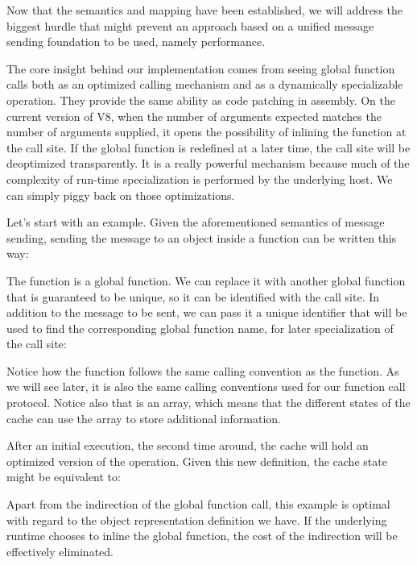 Now that the semantics and mapping have been established, we will address the
biggest hurdle that might prevent an approach based on a unified message
sending foundation to be used, namely performance.

The core insight behind our implementation comes from seeing global function
calls both as an optimized calling mechanism and as a dynamically specializable
operation. They provide the same ability as code patching in assembly. On
the current version of V8, when the number of arguments expected matches the
number of arguments supplied, it opens the possibility of inlining the function
at the call site. If the global function is redefined at a later time, the call
site will be deoptimized transparently. It is a really powerful mechanism
because much of the complexity of run-time specialization is performed by the
underlying host.  We can simply piggy back on those optimizations.

Let's start with an example. Given the aforementioned semantics of message
sending, sending the message  to an object  inside a 
function can be written this way:


The  function is a global function. We can replace it with another
global function that is guaranteed to be unique, so it can be identified with
the call site. In addition to the message to be sent, we can pass it a unique
identifier that will be used to find the corresponding global function name,
for later specialization of the call site:


Notice how the  function follows the same calling convention as
the  function. As we will see later, it is also the same calling
conventions used for our function call protocol. Notice also that
 is an array, which means that the different states of the cache
can use the array to store additional information.

After an initial execution, the second time around, the cache will hold an
optimized version of the operation. Given this new definition, the cache state
might be equivalent to:


Apart from the indirection of the global function call, this example is
optimal with regard to the object representation definition we have. If the
underlying runtime chooses to inline the global function, the cost of the
indirection will be effectively eliminated.

